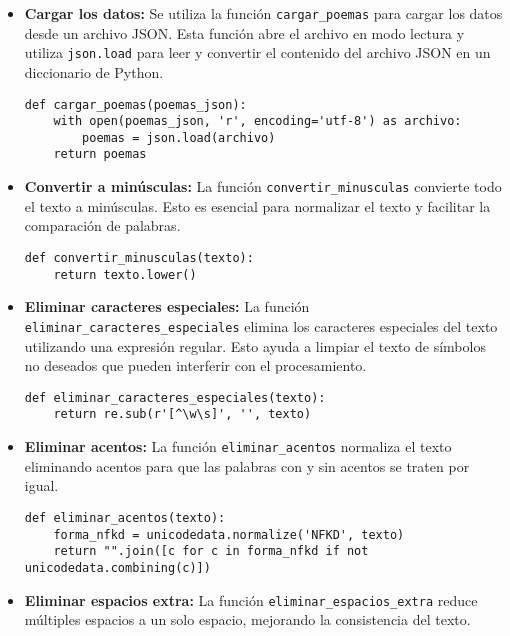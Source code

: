 \begin{itemize}
    \item \textbf{Cargar los datos:} Se utiliza la función \texttt{cargar\_poemas} para cargar los datos desde un archivo JSON. Esta función abre el archivo en modo lectura y utiliza \texttt{json.load} para leer y convertir el contenido del archivo JSON en un diccionario de Python.
    
    \begin{verbatim}
def cargar_poemas(poemas_json):
    with open(poemas_json, 'r', encoding='utf-8') as archivo:
        poemas = json.load(archivo)
    return poemas
    \end{verbatim}

    \item \textbf{Convertir a minúsculas:} La función \texttt{convertir\_minusculas} convierte todo el texto a minúsculas. Esto es esencial para normalizar el texto y facilitar la comparación de palabras.
    
    \begin{verbatim}
def convertir_minusculas(texto):
    return texto.lower()
    \end{verbatim}

    \item \textbf{Eliminar caracteres especiales:} La función \texttt{eliminar\_caracteres\_especiales} elimina los caracteres especiales del texto utilizando una expresión regular. Esto ayuda a limpiar el texto de símbolos no deseados que pueden interferir con el procesamiento.
    
    \begin{verbatim}
def eliminar_caracteres_especiales(texto):
    return re.sub(r'[^\w\s]', '', texto)
    \end{verbatim}

    \item \textbf{Eliminar acentos:} La función \texttt{eliminar\_acentos} normaliza el texto eliminando acentos para que las palabras con y sin acentos se traten por igual.
    
    \begin{verbatim}
def eliminar_acentos(texto):
    forma_nfkd = unicodedata.normalize('NFKD', texto)
    return "".join([c for c in forma_nfkd if not unicodedata.combining(c)])
    \end{verbatim}

    \item \textbf{Eliminar espacios extra:} La función \texttt{eliminar\_espacios\_extra} reduce múltiples espacios a un solo espacio, mejorando la consistencia del texto.
    

\end{itemize}
